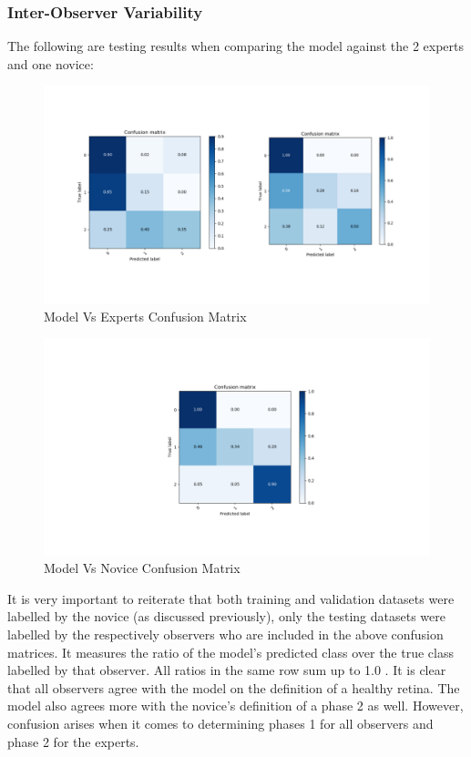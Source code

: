 \documentclass[a4paper]{article}
\begin{document}
        \subsubsection{Inter-Observer Variability}
        The following are testing results when comparing the model against the 2 experts and one novice:
        \begin{figure}[h!]
            \centerline{\includegraphics[width=1\textwidth]{../img/results/lisamichVsModel.pdf}}
            \label{figX: Model Vs Experts Confusion Matrix} 
            \caption{Model Vs Experts Confusion Matrix}
        \end{figure}
        \begin{figure}[h!]
            \centerline{\includegraphics[width=1\textwidth]{../img/results/mohVsModel.pdf}}
            \label{figX: Model Vs Novice Confusion Matrix} 
            \caption{Model Vs Novice Confusion Matrix}
        \end{figure}

        It is very important to reiterate that both training and validation datasets were labelled by the novice (as discussed previously), only the testing datasets were labelled by the respectively observers who are included in the above confusion matrices. It measures the ratio of the model's predicted class over the true class labelled by that observer. All ratios in the same row sum up to 1.0 . It is clear that all observers agree with the model on the definition of a healthy retina. The model also agrees more with the novice's definition of a phase 2 as well. However, confusion arises when it comes to determining phases 1 for all observers and phase 2 for the experts.
        \vspace{3mm}
\end{document}
